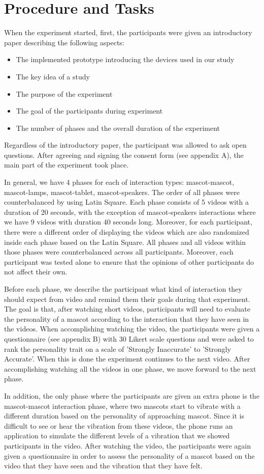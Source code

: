 \section{Procedure and Tasks}
\label{sec:procedure-and-tasks}
When the experiment started, first, the participants were given an introductory paper describing the following aspects:
\begin{itemize}
  \item The implemented prototype introducing the devices used in our study
  \item The key idea of a study
  \item The purpose of the experiment
  \item The goal of the participants during experiment
  \item The number of phases and the overall duration of the experiment
\end{itemize}

Regardless of the introductory paper, the participant was allowed to ask open questions.
After agreeing and signing the consent form (see appendix A), the main part of the experiment took place.
\par In general, we have 4 phases for each of interaction types: mascot-mascot,
mascot-lamps, mascot-tablet, mascot-speakers.
The order of all phases were counterbalanced by using Latin Square.
Each phase consists of 5 videos with a duration of 20 seconds, with the exception of
mascot-speakers interactions where we have 9 videos with duration 40 seconds long.
Moreover, for each participant, there were a different order of displaying the videos
which are also randomized inside each phase based on the Latin Square.
All phases and all videos within those phases were counterbalanced across all participants.
Moreover, each participant was tested alone to ensure that the opinions of other participants do not affect their own.
\par Before each phase, we describe the participant what kind of interaction they should
expect from video and remind them their goals during that experiment.
The goal is that, after watching short videos, participants will need to evaluate the personality
of a mascot according to the interaction that they have seen in the videos.
When accomplishing watching the video, the participants were given a questionnaire
(see appendix B) with 30 Likert scale questions and were asked to rank the personality trait
on a scale of 'Strongly Inaccurate' to 'Strongly Accurate'.
When this is done the experiment continues to the next video.
After accomplishing watching all the videos in one phase, we move forward to the next phase.
\par In addition, the only phase where the participants are given an extra phone
is the mascot-mascot interaction phase, where two mascots start to vibrate
with a different duration based on the personality of approaching mascot.
Since it is difficult to see or hear the vibration from these videos, the phone runs an
application to simulate the different levels of a vibration that we showed participants in the video.
After watching the video, the participants were again given a questionnaire in order to assess
the personality of a mascot based on the video that they have seen and the vibration that they have felt.

